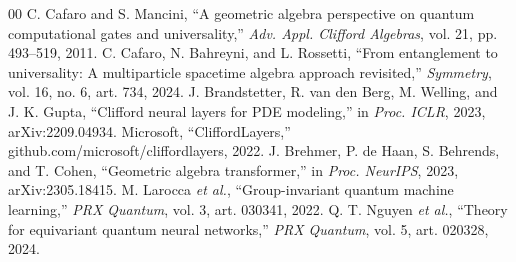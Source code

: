 \documentclass[conference]{IEEEtran}
\begin{document}
\begin{thebibliography}{00}
 C. Cafaro and S. Mancini, ``A geometric algebra perspective on quantum computational gates and universality,'' \emph{Adv. Appl. Clifford Algebras}, vol. 21, pp. 493--519, 2011.
 C. Cafaro, N. Bahreyni, and L. Rossetti, ``From entanglement to universality: A multiparticle spacetime algebra approach revisited,'' \emph{Symmetry}, vol. 16, no. 6, art. 734, 2024.
 J. Brandstetter, R. van den Berg, M. Welling, and J. K. Gupta, ``Clifford neural layers for PDE modeling,'' in \emph{Proc. ICLR}, 2023, arXiv:2209.04934.
 Microsoft, ``CliffordLayers,'' github.com/microsoft/cliffordlayers, 2022.
 J. Brehmer, P. de Haan, S. Behrends, and T. Cohen, ``Geometric algebra transformer,'' in \emph{Proc. NeurIPS}, 2023, arXiv:2305.18415.
 M. Larocca \emph{et al.}, ``Group-invariant quantum machine learning,'' \emph{PRX Quantum}, vol. 3, art. 030341, 2022.
 Q. T. Nguyen \emph{et al.}, ``Theory for equivariant quantum neural networks,'' \emph{PRX Quantum}, vol. 5, art. 020328, 2024.
\end{thebibliography}
\end{document}
